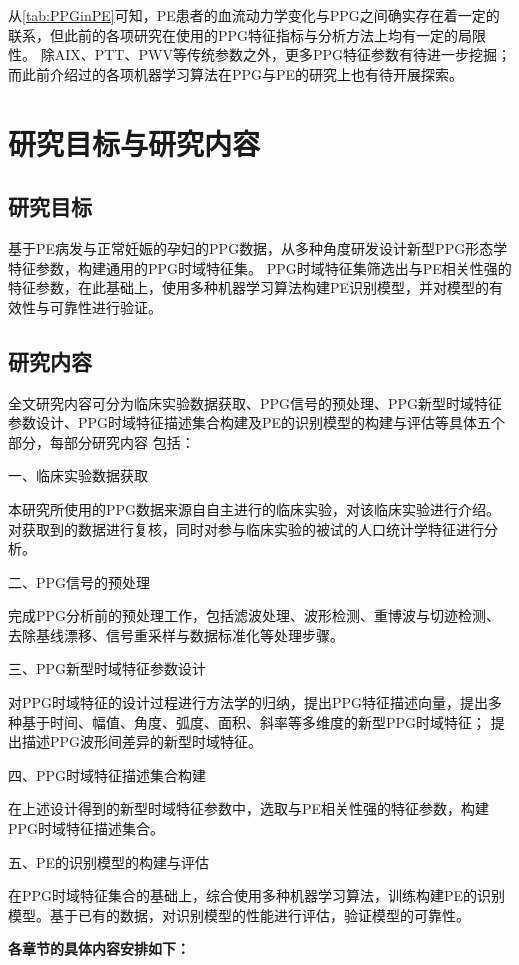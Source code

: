 从\autoref{tab:PPGinPE}可知，PE患者的血流动力学变化与PPG之间确实存在着一定的联系，但此前的各项研究在使用的PPG特征指标与分析方法上均有一定的局限性。
除AIX、PTT、PWV等传统参数之外，更多PPG特征参数有待进一步挖掘；而此前介绍过的各项机器学习算法在PPG与PE的研究上也有待开展探索。

\section{研究目标与研究内容}

\subsection{研究目标}
基于PE病发与正常妊娠的孕妇的PPG数据，从多种角度研发设计新型PPG形态学特征参数，构建通用的PPG时域特征集。
PPG时域特征集筛选出与PE相关性强的特征参数，在此基础上，使用多种机器学习算法构建PE识别模型，并对模型的有效性与可靠性进行验证。
\subsection{研究内容}
全文研究内容可分为临床实验数据获取、PPG信号的预处理、PPG新型时域特征参数设计、PPG时域特征描述集合构建及PE的识别模型的构建与评估等具体五个部分，每部分研究内容
包括：

一、临床实验数据获取

本研究所使用的PPG数据来源自自主进行的临床实验，对该临床实验进行介绍。对获取到的数据进行复核，同时对参与临床实验的被试的人口统计学特征进行分析。

二、PPG信号的预处理

完成PPG分析前的预处理工作，包括滤波处理、波形检测、重博波与切迹检测、去除基线漂移、信号重采样与数据标准化等处理步骤。

三、PPG新型时域特征参数设计

对PPG时域特征的设计过程进行方法学的归纳，提出PPG特征描述向量，提出多种基于时间、幅值、角度、弧度、面积、斜率等多维度的新型PPG时域特征；
提出描述PPG波形间差异的新型时域特征。

四、PPG时域特征描述集合构建

在上述设计得到的新型时域特征参数中，选取与PE相关性强的特征参数，构建PPG时域特征描述集合。

五、PE的识别模型的构建与评估

在PPG时域特征集合的基础上，综合使用多种机器学习算法，训练构建PE的识别模型。基于已有的数据，对识别模型的性能进行评估，验证模型的可靠性。

\textbf{各章节的具体内容安排如下：}


